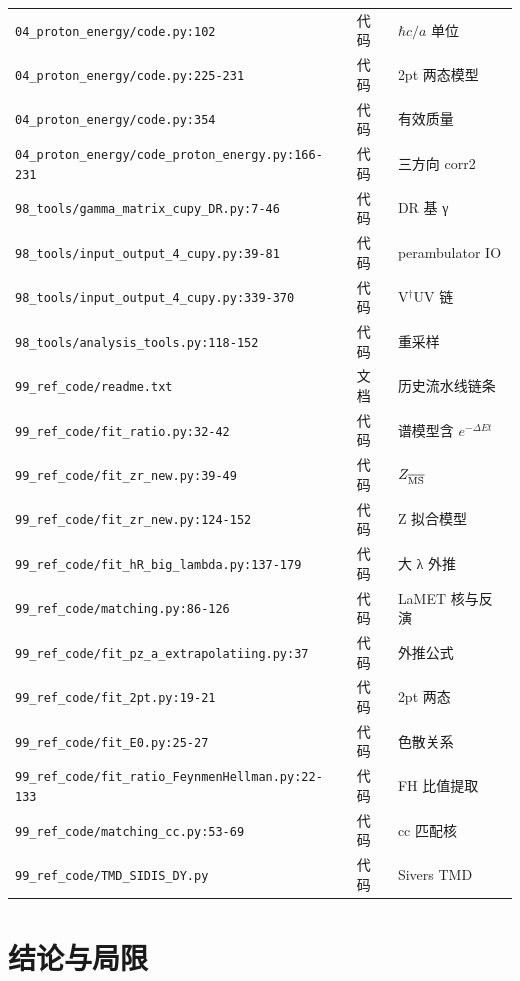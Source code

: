 \documentclass[UTF8]{ctexart}
\begin{document}
\begin{table}[h]
\begin{tabular}{llp{7.5cm}}
\texttt{04\_proton\_energy/code.py:102} & 代码 & $\hbar c/a$ 单位 \\
\texttt{04\_proton\_energy/code.py:225-231} & 代码 & 2pt 两态模型 \\
\texttt{04\_proton\_energy/code.py:354} & 代码 & 有效质量 \\
\texttt{04\_proton\_energy/code\_proton\_energy.py:166-231} & 代码 & 三方向 corr2 \\
\texttt{98\_tools/gamma\_matrix\_cupy\_DR.py:7-46} & 代码 & DR 基 γ \\
\texttt{98\_tools/input\_output\_4\_cupy.py:39-81} & 代码 & perambulator IO \\
\texttt{98\_tools/input\_output\_4\_cupy.py:339-370} & 代码 & V$^\dagger$UV 链 \\
\texttt{98\_tools/analysis\_tools.py:118-152} & 代码 & 重采样 \\
\texttt{99\_ref\_code/readme.txt} & 文档 & 历史流水线链条 \\
\texttt{99\_ref\_code/fit\_ratio.py:32-42} & 代码 & 谱模型含 $e^{-\Delta Et}$ \\
\texttt{99\_ref\_code/fit\_zr\_new.py:39-49} & 代码 & $Z_{\overline{\rm MS}}$ \\
\texttt{99\_ref\_code/fit\_zr\_new.py:124-152} & 代码 & Z 拟合模型 \\
\texttt{99\_ref\_code/fit\_hR\_big\_lambda.py:137-179} & 代码 & 大 λ 外推 \\
\texttt{99\_ref\_code/matching.py:86-126} & 代码 & LaMET 核与反演 \\
\texttt{99\_ref\_code/fit\_pz\_a\_extrapolatiing.py:37} & 代码 & 外推公式 \\
\texttt{99\_ref\_code/fit\_2pt.py:19-21} & 代码 & 2pt 两态 \\
\texttt{99\_ref\_code/fit\_E0.py:25-27} & 代码 & 色散关系 \\
\texttt{99\_ref\_code/fit\_ratio\_FeynmenHellman.py:22-133} & 代码 & FH 比值提取 \\
\texttt{99\_ref\_code/matching\_cc.py:53-69} & 代码 & cc 匹配核 \\
\texttt{99\_ref\_code/TMD\_SIDIS\_DY.py} & 代码 & Sivers TMD \\
\bottomrule
\end{tabular}
\end{table}

\section{结论与局限}
\end{document}
